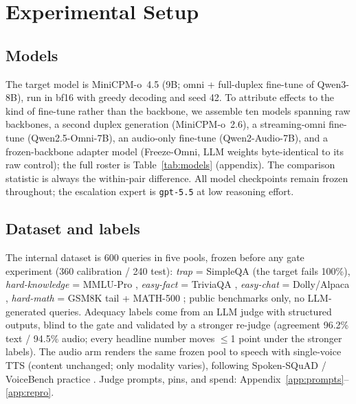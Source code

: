\section{Experimental Setup}
\label{sec:setup}

\subsection{Models}
\label{sec:models}
The target model is MiniCPM-o~4.5 (9B; omni + full-duplex fine-tune of
Qwen3-8B), run in bf16 with greedy decoding and seed 42. To attribute
effects to the kind of fine-tune rather than the backbone, we assemble
ten models spanning raw backbones, a second duplex generation
(MiniCPM-o~2.6), a streaming-omni fine-tune (Qwen2.5-Omni-7B), an
audio-only fine-tune (Qwen2-Audio-7B), and a frozen-backbone adapter
model (Freeze-Omni, LLM weights byte-identical to its raw control);
the full roster is Table~\ref{tab:models} (appendix). The comparison
statistic is always the within-pair difference. All model checkpoints
remain frozen throughout; the escalation expert is \texttt{gpt-5.5} at
low reasoning effort.

\subsection{Dataset and labels}
\label{sec:dataset}
The internal dataset is 600 queries in five pools, frozen before any
gate experiment (360 calibration / 240 test): \emph{trap} = SimpleQA
\citep{wei2024simpleqa} (the target fails 100\%), \emph{hard-knowledge}
= MMLU-Pro \citep{wang2024mmlupro}, \emph{easy-fact} = TriviaQA
\citep{joshi2017triviaqa}, \emph{easy-chat} = Dolly/Alpaca
\citep{conover2023dolly,taori2023alpaca}, \emph{hard-math} = GSM8K tail
+ MATH-500 \citep{cobbe2021gsm8k,hendrycks2021math,lightman2024lets};
public benchmarks only, no LLM-generated queries. Adequacy labels come
from an LLM judge \citep{zheng2023judging} with structured outputs,
blind to the gate and validated by a stronger re-judge (agreement 96.2\%
text / 94.5\% audio; every headline number moves $\le$1 point under the
stronger labels). The audio arm renders the same frozen pool to speech
with single-voice TTS (content unchanged; only modality varies),
following Spoken-SQuAD / VoiceBench practice
\citep{li2018spokensquad,chen2024voicebench}. Judge prompts, pins, and
spend: Appendix~\ref{app:prompts}--\ref{app:repro}.


